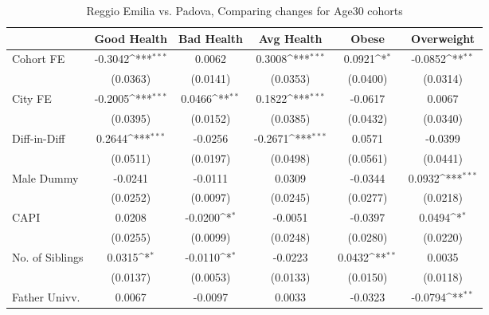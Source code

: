 \begin{table}[htbp]\centering
\def\sym#1{\ifmmode^{#1}\else\(^{#1}\)\fi}
\caption{Reggio Emilia vs. Padova, Comparing changes for Age30 cohorts}
\begin{tabular}{l*{5}{c}}
\toprule
            &\multicolumn{1}{c}{Good Health}&\multicolumn{1}{c}{Bad Health}&\multicolumn{1}{c}{Avg Health}&\multicolumn{1}{c}{Obese}&\multicolumn{1}{c}{Overweight}\\
\midrule
Cohort FE   &     -0.3042\sym{***}&      0.0062         &      0.3008\sym{***}&      0.0921\sym{*}  &     -0.0852\sym{**} \\
            &    (0.0363)         &    (0.0141)         &    (0.0353)         &    (0.0400)         &    (0.0314)         \\
\addlinespace
City FE     &     -0.2005\sym{***}&      0.0466\sym{**} &      0.1822\sym{***}&     -0.0617         &      0.0067         \\
            &    (0.0395)         &    (0.0152)         &    (0.0385)         &    (0.0432)         &    (0.0340)         \\
\addlinespace
Diff-in-Diff&      0.2644\sym{***}&     -0.0256         &     -0.2671\sym{***}&      0.0571         &     -0.0399         \\
            &    (0.0511)         &    (0.0197)         &    (0.0498)         &    (0.0561)         &    (0.0441)         \\
\addlinespace
Male Dummy  &     -0.0241         &     -0.0111         &      0.0309         &     -0.0344         &      0.0932\sym{***}\\
            &    (0.0252)         &    (0.0097)         &    (0.0245)         &    (0.0277)         &    (0.0218)         \\
\addlinespace
CAPI        &      0.0208         &     -0.0200\sym{*}  &     -0.0051         &     -0.0397         &      0.0494\sym{*}  \\
            &    (0.0255)         &    (0.0099)         &    (0.0248)         &    (0.0280)         &    (0.0220)         \\
\addlinespace
No. of Siblings&      0.0315\sym{*}  &     -0.0110\sym{*}  &     -0.0223         &      0.0432\sym{**} &      0.0035         \\
            &    (0.0137)         &    (0.0053)         &    (0.0133)         &    (0.0150)         &    (0.0118)         \\
\addlinespace
Father Univv.&      0.0067         &     -0.0097         &      0.0033         &     -0.0323         &     -0.0794\sym{**} \\

\end{tabular}
\end{table}
